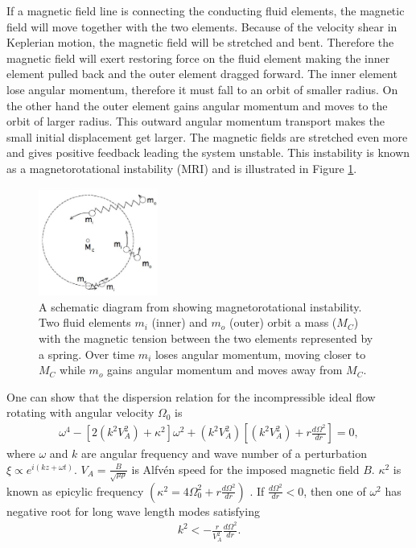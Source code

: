 \documentclass{jfm}
\begin{document}
If a magnetic field line is connecting the conducting fluid elements, the magnetic field will move together with the two elements. Because of the velocity shear in Keplerian motion, the magnetic field will be stretched and bent. Therefore the magnetic field will exert restoring force on the fluid element making the inner element pulled back and the outer element dragged forward. The inner element lose angular momentum, therefore it must fall to an orbit of smaller radius. On the other hand the outer element gains angular momentum and moves to the orbit of larger radius. This outward angular momentum transport makes the small initial displacement get larger. The magnetic fields are stretched even more and gives positive feedback leading the system unstable. This instability is known as a magnetorotational instability (MRI) and is illustrated in Figure \ref{fig:mri}.

\begin{figure}[t]
    \centering
    \includegraphics[width=0.35\textwidth]{Balbus2009_diagram}
        \caption{A schematic diagram from \cite{Balbus2009} showing magnetorotational instability. Two fluid elements $m_i$ (inner) and $m_o$ (outer) orbit a mass ($M_C$) with the magnetic tension between the two elements represented by a spring. Over time $m_i$ loses angular momentum, moving closer to $M_C$ while $m_o$ gains angular momentum and moves away from $M_C$.}
        \label{fig:mri}
\end{figure}

One can show that the dispersion relation for the incompressible ideal flow rotating with angular velocity $\Omega_0$ is
\begin{align}
    \omega^4-\left[2\left(k^2 V_A^2\right) +\kappa^2\right]\omega^2 +\left(k^2 V_A^2\right)\left[\left(k^2 V_A^2\right)+r\frac{d \Omega^2}{dr}\right]=0,
\end{align}
where $\omega$ and $k$ are angular frequency and wave number of a perturbation $\xi \propto e^{i(k z+\omega t)}$. $V_A=\frac{B}{\sqrt{\mu \rho}}$ is Alfv\'en speed for the imposed magnetic field $B$. $\kappa^2$ is known as epicylic frequency $\left(\kappa^2=4\Omega_0^2 + r \frac{d \Omega^2}{dr}\right)$ \citep[see][]{Balbus1991,Balbus1998,Balbus2003}. If $\frac{d \Omega^2}{dr}<0$, then one of $\omega^2$ has negative root for long wave length modes satisfying
\begin{align}
    k^2 < -\frac{r}{V_A^2}\frac{d\Omega^2}{dr}.
\end{align}
\end{document}
